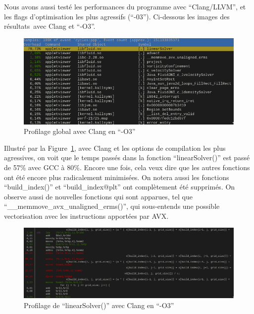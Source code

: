 \documentclass[12pt,a4paper]{article}
\begin{document}
Nous avons aussi testé les performances du programme avec
\enquote{Clang/\ac{LLVM}}, et les flags d’optimisation les plus agressifs
(\enquote{-03}). Ci-dessous les images des résultats avec Clang et \enquote{-O3}.

\begin{figure}
    \centering
    \includegraphics[scale=0.58]{figures/optims/clang-O3/global.png}
    \caption{Profilage global avec Clang en \enquote{-O3}}
    \label{fig.optim.compil.clang.global}
\end{figure}

Illustré par la Figure~\ref{fig.optim.compil.clang.global}, avec Clang et
les options de compilation les plus agressives, on voit que le temps passés dans
la fonction \enquote{linearSolver()} est passé de 57\% avec \ac{GCC} à 80\%.
Encore une fois, cela veux dire que les autres fonctions ont été encore plus
radicalement minimisées. On notera aussi les fonctions \enquote{build\_index()}
et \enquote{build\_index@plt} ont complètement été supprimés. On observe aussi
de nouvelles fonctions qui sont apparues, tel que
\enquote{\_\_memmove\_avx\_unaligned\_erms()}, qui sous-entends une possible
vectorisation avec les instructions apportées par \ac{AVX}.

\begin{figure}
    \centering
    \includegraphics[scale=0.35]{figures/optims/clang-O3/linearSolver.png}
    \caption{Profilage de \enquote{linearSolver()} avec Clang en \enquote{-O3}}
    \label{fig.optim.compil.clang.linearSolver}
\end{figure}
\end{document}
